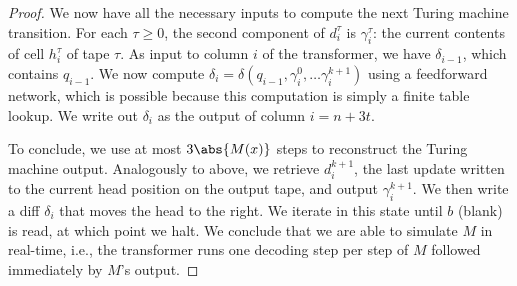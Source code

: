 \begin{proof}
    We now have all the necessary inputs to compute the next Turing machine transition.
    For each $\tau \geq 0$, the second component of $d^\tau_i$ is $\gamma^\tau_i$: the current contents of cell $h^\tau_i$ of tape $\tau$. As input to column $i$ of the transformer, we have $\delta_{i - 1}$, which contains $q_{i-1}$. We now compute
        $\delta_i = \delta(q_{i-1}, \gamma^0_i, \ldots \gamma^{k + 1}_i)$
    using a feedforward network, which is possible because this computation is simply a finite table lookup. We write out $\delta_i$ as the output of column $i = n + 3t$.


    To conclude, we use at most $3\abs{M(x)}$ steps to reconstruct the Turing machine output. Analogously to above, we retrieve $d^{k+1}_i$, the last update written to the current head position on the output tape, and output $\gamma^{k+1}_i$. We then write a diff $\delta_i$ that moves the head to the right. We iterate in this state until $b$ (blank) is read, at which point we halt.
    We conclude that we are able to simulate $M$ in real-time, i.e., the transformer runs one decoding step per step of $M$ followed immediately by $M$'s output.
\end{proof}